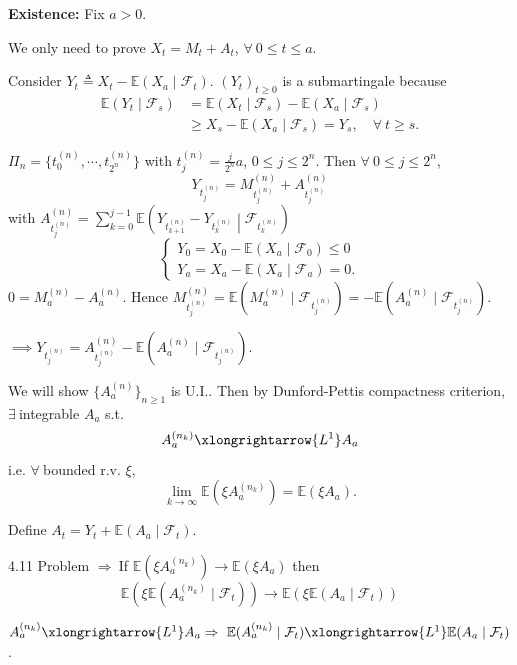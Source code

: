 {    \textbf{Existence: }Fix $a > 0$.
    
    We only need to prove $X_t = M_t + A_t$, $\forall~ 0 \leq t \leq a$.

    Consider $Y_t \triangleq X_t - \mathbb{E}(X_a \mid \mathcal{F}_t)$. $(Y_t)_{t \geq 0}$ is a submartingale because 
    $$
    \begin{aligned}
    \mathbb{E}(Y_t \mid \mathcal{F}_s)&= \mathbb{E}(X_t \mid \mathcal{F}_s) - \mathbb{E}(X_a \mid \mathcal{F}_s) \\
    &\geq X_s - \mathbb{E}(X_a \mid \mathcal{F}_s) = Y_s, \quad \forall~t \geq s.
    \end{aligned}
    $$

    $\Pi_n = \{t_0^{(n)},\cdots, t_{2^n}^{(n)}\}$ with $t_j^{(n)} = \frac{j}{2^n}a$, $0 \leq j \leq 2^n$. Then $\forall~ 0 \leq j \leq 2^n$, 
    $$
        Y_{t_{j}^{(n)}} = M_{t_{j}^{(n)}}^{(n)} + A_{t_j^{(n)}}^{(n)}
    $$
    with $A_{t_j^{(n)}}^{(n)} = \sum_{k=0}^{j-1}\mathbb{E}\left( Y_{t_{k+1}^{(n)}} - Y_{t_{k}^{(n)}} \middle| \mathcal{F}_{t_{k}^{(n)}}\right)$
    $$
    \begin{cases}
        Y_0 = X_0 - \mathbb{E}(X_a \mid \mathcal{F_0}) \leq 0\\
        Y_a = X_a - \mathbb{E}(X_a \mid \mathcal{F}_a) = 0.
    \end{cases}
    $$
    $0 = M_a ^{(n)} - A_a^{(n)}$. Hence $M_{t_{j}^{(n)}}^{(n)} = \mathbb{E}(M_a^{(n)} \mid \mathcal{F}_{t_{j}^{(n)}}) = - \mathbb{E}(A_a^{(n)} \mid \mathcal{F}_{t_{j}^{(n)}}).$

    $\implies Y_{t_{j}^{(n)}} = A_{t_{j}^{(n)}}^{(n)} - \mathbb{E}(A_a^{(n)} \mid \mathcal{F}_{t_{j}^{(n)}})$.

    We will show $\{A_a^{(n)}\}_{n \geq 1}$ is U.I.. Then by Dunford-Pettis compactness criterion, $\exists~$integrable $A_a$ s.t. 
    $$
        A_a^{(n_k)} \xlongrightarrow{L^1} A_a
    $$ 
    i.e. $\forall~$bounded r.v. $\xi$, 
    $$
    \lim_{k \to \infty} \mathbb{E}(\xi A_a^{(n_k)}) = \mathbb{E}(\xi A_a).
    $$

    Define $A_t = Y_t + \mathbb{E}(A_a \mid \mathcal{F}_t)$.

    4.11 Problem $\Rightarrow~$If $\mathbb{E}(\xi A_a^{(n_k)}) \to \mathbb{E}(\xi A_a)$ then 
    $$
    \mathbb{E}(\xi \mathbb{E}(A_a^{(n_k)} \mid \mathcal{F}_t)) \to \mathbb{E}(\xi \mathbb{E}(A_a \mid \mathcal{F}_t))
    $$

    $A_a^{(n_k)} \xlongrightarrow{L^1} A_a \Rightarrow~ \mathbb{E}(A_a^{(n_k)} \mid \mathcal{F}_t) \xlongrightarrow{L^1} \mathbb{E}(A_a \mid \mathcal{F}_t)$.

}
